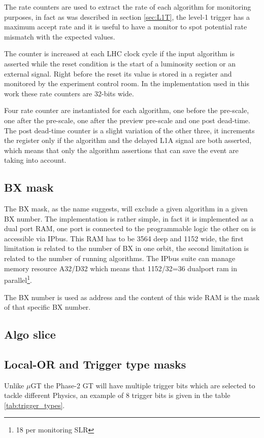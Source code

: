 \documentclass[a4paper,11pt]{article}
\begin{document}
The rate counters are used to extract the rate of each algorithm for monitoring purposes, in fact as was described in section \ref{sec:L1T}, the level-1 trigger has a maximum accept rate and it is useful to have a monitor to spot potential rate mismatch with the expected values. 

The counter is increased at each LHC clock cycle if the input algorithm is asserted while the reset condition is the start of a luminosity section or an external signal. Right before the reset its value is stored in a register and monitored by the experiment control room. In the implementation used in this work these rate counters are 32-bits wide.

Four rate counter are instantiated for each algorithm, one before the pre-scale, one after the pre-scale, one after the preview pre-scale and one post dead-time. The post dead-time counter is a slight variation of the other three, it increments the register only if the algorithm and the delayed L1A signal are both asserted,  which means that only the algorithm assertions that can save the event are taking into account.


\subsection{BX mask}
The BX mask, as the name suggests, will exclude a given algorithm in a given BX number. The implementation is rather simple, in fact it is implemented as a dual port RAM, one port is connected to the programmable logic the other on is accessible via IPbus. This RAM has to be 3564 deep and 1152 wide, the first limitation is related to the number of BX in one orbit, the second limitation is related to the number of running algorithms. The IPbus suite can manage memory resource A32/D32 which means that 1152/32=36 dualport ram in parallel\footnote{18 per monitoring SLR}.  

The BX number is used as address and the content of this wide RAM is the mask of that specific BX number.

\subsection{Algo slice}

\subsection{Local-OR and Trigger type masks}
Unlike $\mu$GT the Phase-2 GT will have multiple trigger bits which are selected to tackle different Physics, an example of 8 trigger bits is given in the table \ref{tab:trigger_types}.  
\end{document}
